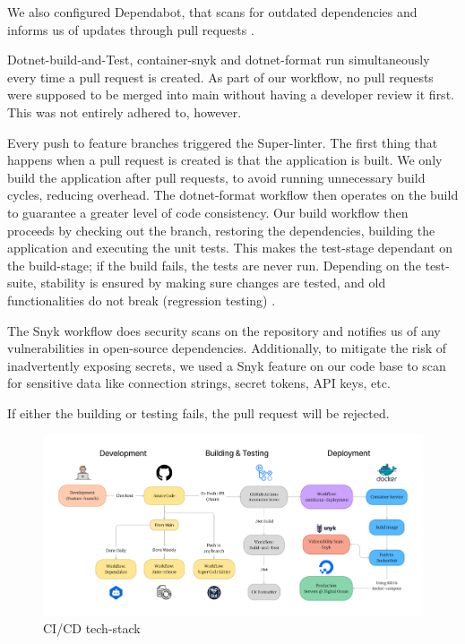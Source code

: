 We also configured Dependabot, that scans for outdated dependencies and informs us of updates through pull requests \autocite{dependabot}.

Dotnet-build-and-Test, container-snyk and dotnet-format run simultaneously every time a pull request is created. As part of our workflow, no pull requests were supposed to be merged into main without having a developer review it first. This was not entirely adhered to, however.

Every push to feature branches triggered the Super-linter. The first thing that happens when a pull request is created is that the application is built. We only build the application after pull requests, to avoid running unnecessary build cycles, reducing overhead. The dotnet-format workflow then operates on the build to guarantee a greater level of code consistency. Our build workflow then proceeds by checking out the branch, restoring the dependencies, building the application and executing the unit tests. This makes the test-stage dependant on the build-stage; if the build fails, the tests are never run. Depending on the test-suite, stability is ensured by making sure changes are tested, and old functionalities do not break (regression testing) \autocite{regression-testing}.

The Snyk workflow does security scans on the repository and notifies us of any vulnerabilities in open-source dependencies. Additionally, to mitigate the risk of inadvertently exposing secrets, we used a Snyk feature on our code base to scan for sensitive data like connection strings, secret tokens, API keys, etc.

If either the building or testing fails, the pull request will be rejected.

\begin{figure}
    \centering
    \includegraphics[width=1.0\linewidth]{Images/CICD_Chain.png}
    \caption{CI/CD tech-stack}
    \label{fig:CI/CD Overview}
\end{figure}

